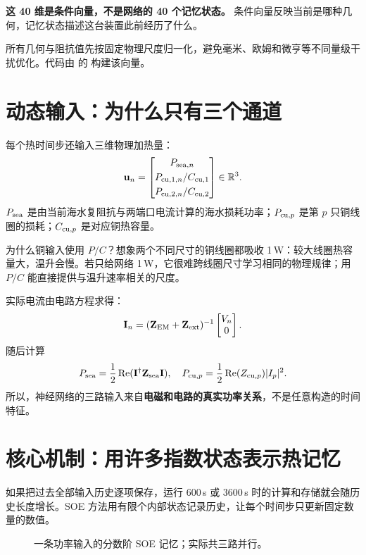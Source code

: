 \textbf{这 40 维是条件向量，不是网络的 40 个记忆状态。} 条件向量反映当前是哪种几何，记忆状态描述这台装置此前经历了什么。

所有几何与阻抗值先按固定物理尺度归一化，避免毫米、欧姆和微亨等不同量级干扰优化。代码由  的  构建该向量。

\section{动态输入：为什么只有三个通道}
每个热时间步还输入三维物理加热量：
\begin{equation}
\label{eq:u3}
\mathbf u_n=
\begin{bmatrix}
P_{{\rm sea},n}\\[1mm]
P_{{\rm cu},1,n}/C_{{\rm cu},1}\\[1mm]
P_{{\rm cu},2,n}/C_{{\rm cu},2}
\end{bmatrix}
\in\mathbb R^3.
\end{equation}
$P_{\rm sea}$ 是由当前海水复阻抗与两端口电流计算的海水损耗功率；$P_{{\rm cu},p}$ 是第 $p$ 只铜线圈的损耗；$C_{{\rm cu},p}$ 是对应铜热容量。

为什么铜输入使用 $P/C$？想象两个不同尺寸的铜线圈都吸收 1\,W：较大线圈热容量大，温升会慢。若只给网络 1\,W，它很难跨线圈尺寸学习相同的物理规律；用 $P/C$ 能直接提供与温升速率相关的尺度。

实际电流由电路方程求得：
\[
\mathbf I_n=(\mathbf Z_{\mathrm{EM}}+\mathbf Z_{\mathrm{ext}})^{-1}\begin{bmatrix}V_n\\0\end{bmatrix}.
\]
随后计算
\[
P_{\rm sea}=\frac12\operatorname{Re}(\mathbf I^\dagger\mathbf Z_{\mathrm{sea}}\mathbf I),
\quad
P_{{\rm cu},p}=\frac12\operatorname{Re}(Z_{{\rm cu},p})|I_p|^2.
\]
所以，神经网络的三路输入来自\textbf{电磁和电路的真实功率关系}，不是任意构造的时间特征。

\section{核心机制：用许多指数状态表示热记忆}
\label{sec:soe}
如果把过去全部输入历史逐项保存，运行 600\,s 或 3600\,s 时的计算和存储就会随历史长度增长。SOE 方法用有限个内部状态记录历史，让每个时间步只更新固定数量的数值。

\begin{figure}[htbp]
\centering\resizebox{\textwidth}{!}{}
\caption{一条功率输入的分数阶 SOE 记忆；实际共三路并行。}
\label{fig:soe}
\end{figure}


